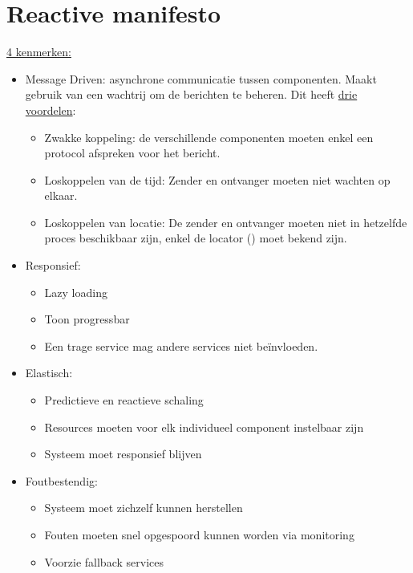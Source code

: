 	\section{Reactive manifesto}
	\underline{4 kenmerken:}
	\begin{itemize}
		\item[\info] Message Driven: asynchrone communicatie tussen componenten. Maakt gebruik van een wachtrij om de berichten te beheren. Dit heeft \underline{drie voordelen}:
		\begin{itemize}
			\item[\good] Zwakke koppeling: de verschillende componenten moeten enkel een protocol afspreken voor het bericht. 
			\item[\good] Loskoppelen van de tijd: Zender en ontvanger moeten niet wachten op elkaar.
			\item[\good] Loskoppelen van locatie: De zender en ontvanger moeten niet in hetzelfde proces beschikbaar zijn, enkel de locator () moet bekend zijn.
		\end{itemize}
		\item[\info] Responsief:
			\begin{itemize}
				\item[\info] Lazy loading
				\item[\info] Toon progressbar
				\item[\info] Een trage service mag andere services niet beïnvloeden.
			\end{itemize}
		\item[\info] Elastisch:
			\begin{itemize}
				\item[\info] Predictieve en reactieve schaling
				\item[\info] Resources moeten voor elk individueel component instelbaar zijn
				\item[\info] Systeem moet responsief blijven
			\end{itemize}
		\item[\info] Foutbestendig:
			\begin{itemize}
				\item[\info] Systeem moet zichzelf kunnen herstellen
				\item[\info] Fouten moeten snel opgespoord kunnen worden via monitoring
				\item[\info] Voorzie fallback services
			\end{itemize}
	\end{itemize}